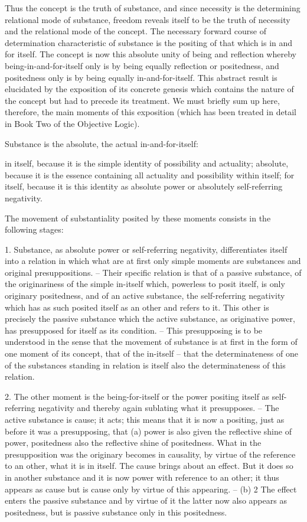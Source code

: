 Thus the concept is the truth of substance,
and since necessity is the determining relational mode of substance,
freedom reveals itself to be the truth of necessity
and the relational mode of the concept.
The necessary forward course of determination
characteristic of substance is the positing
of that which is in and for itself.
The concept is now this absolute
unity of being and reflection
whereby being-in-and-for-itself
only is by being equally reflection or positedness,
and positedness only is by being equally in-and-for-itself.
This abstract result is elucidated by the
exposition of its concrete genesis
which contains the nature of the concept
but had to precede its treatment.
We must briefly sum up here, therefore,
the main moments of this exposition
(which has been treated in detail in
Book Two of the Objective Logic).

Substance is the absolute,
the actual in-and-for-itself:

in itself, because it is the simple
identity of possibility and actuality;
absolute, because it is the essence containing
all actuality and possibility within itself;
for itself, because it is this identity
as absolute power or absolutely self-referring negativity.

The movement of substantiality posited by these moments
consists in the following stages:

1. Substance, as absolute power or self-referring negativity, differentiates
itself into a relation in which what are at first only simple moments are
substances and original presuppositions. – Their specific relation is that
of a passive substance, of the originariness of the simple in-itself which,
powerless to posit itself, is only originary positedness, and of an active
substance, the self-referring negativity which has as such posited itself as
an other and refers to it. This other is precisely the passive substance
which the active substance, as originative power, has presupposed for itself
as its condition. – This presupposing is to be understood in the sense
that the movement of substance is at first in the form of one moment of
its concept, that of the in-itself – that the determinateness of one of the
substances standing in relation is itself also the determinateness of this
relation.

2. The other moment is the being-for-itself or the power positing itself as
self-referring negativity and thereby again sublating what it presupposes. –
The active substance is cause; it acts; this means that it is now a positing,
just as before it was a presupposing, that (a) power is also given the reflective
shine of power, positedness also the reflective shine of positedness. What
in the presupposition was the originary becomes in causality, by virtue
of the reference to an other, what it is in itself. The cause brings about
an effect. But it does so in another substance and it is now power with
reference to an other; it thus appears as cause but is cause only by virtue
of this appearing. – (b) 2 The effect enters the passive substance and
by virtue of it the latter now also appears as positedness, but is passive
substance only in this positedness.

